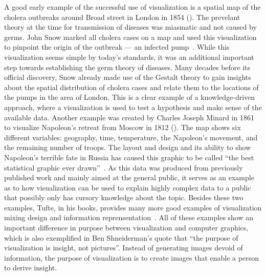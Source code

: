 A good early example of the successful use of visualization is a spatial map of the cholera outbreaks around Broad street in London in 1854 ().  The prevelant theory at the time for transmission of diseases was miasmatic and not caused by germs.  John Snow marked all cholera cases on a map and used this visualization to pinpoint the origin of the outbreak --- an infected pump~\cite{snow1855mode}.  While this visualization seems simple by today's standards, it was an additional important step towards establishing the germ theory of diseases.  Many decades before its official discovery, Snow already made use of the Gestalt theory to gain insights about the spatial distribution of cholera cases and relate them to the locations of the pumps in the area of London.  This is a clear example of a knowledge-driven approach, where a visualization is used to test a hypothesis and make sense of the available data.  Another example was created by Charles Joseph Minard in 1861 to visualize Napoleon's retreat from Moscow in 1812 ().  The map shows six different variables: geography, time, temperature, the Napoleon’s movement, and the remaining number of troops.  The layout and design and its ability to show Napoleon's terrible fate in Russia has caused this graphic to be called ``the best statistical graphic ever drawn''~\cite{tufte1983visual}.  As this data was produced from previously published work and mainly aimed at the general public, it serves as an example as to how visualization can be used to explain highly complex data to a public that possibly only has cursory knowledge about the topic.  Besides these two examples, Tufte, in his books, provides many more good examples of visualization mixing design and information reprensentation~\cite{tufte1991envisioning}.  All of these examples show an important difference in purpose between visualization and computer graphics, which is also exemplified in Ben Shneiderman's quote that ``the purpose of visualization is insight, not pictures''.  Instead of generating images devoid of information, the purpose of visualization is to create images that enable a person to derive insight.


